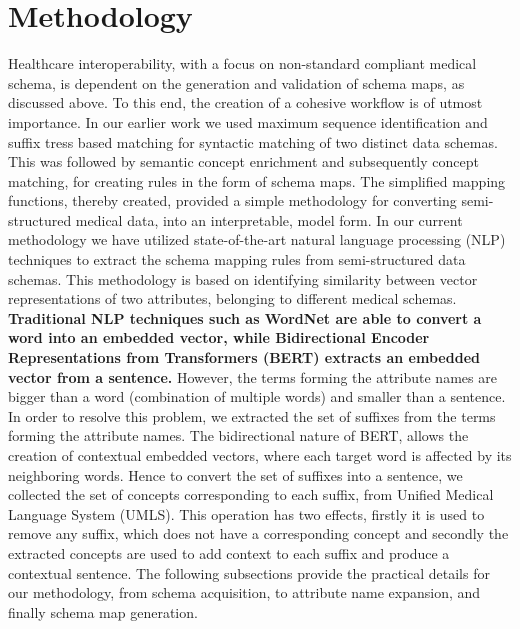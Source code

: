 \documentclass{ieeeaccess}
\begin{document}
\section{Methodology}
\label{methodology}
Healthcare interoperability, with a focus on non-standard compliant medical schema, is dependent on the generation and validation of schema maps, as discussed above. To this end, the creation of a cohesive workflow is of utmost importance. In our earlier work \cite{Satti2020} we used maximum sequence identification and suffix tress based matching for syntactic matching of two distinct data schemas. This was followed by semantic concept enrichment and subsequently concept matching, for creating rules in the form of schema maps. The simplified mapping functions, thereby created, provided a simple methodology for converting semi-structured medical data, into an interpretable, model form.
In our current methodology we have utilized state-of-the-art natural language processing (NLP) techniques to extract the schema mapping rules from semi-structured data schemas. This methodology is based on identifying similarity between vector representations of two attributes, belonging to different medical schemas. 
\textbf{Traditional NLP techniques such as WordNet are able to convert a word into an embedded vector, while Bidirectional Encoder Representations from Transformers (BERT) extracts an embedded vector from a sentence.} However, the terms forming the attribute names are bigger than a word (combination of multiple words) and smaller than a sentence. In order to resolve this problem, we extracted the set of suffixes from the terms forming the attribute names. The bidirectional nature of BERT, allows the creation of contextual embedded vectors, where each target word is affected by its neighboring words. Hence to convert the set of suffixes into a sentence, we collected the set of concepts corresponding to each suffix, from Unified Medical Language System (UMLS). This operation has two effects, firstly it is used to remove any suffix, which does not have a corresponding concept and secondly the extracted concepts are used to add context to each suffix and produce a contextual sentence. 
The following subsections provide the practical details for our methodology, from schema acquisition, to attribute name expansion, and finally schema map generation.
\end{document}
